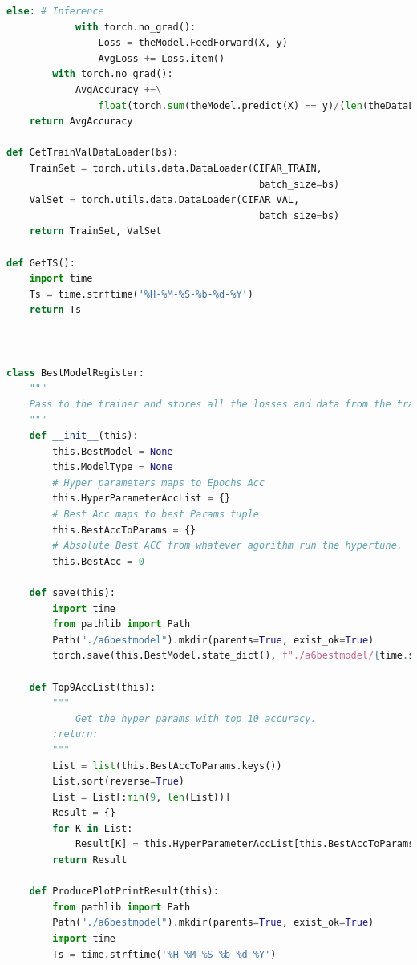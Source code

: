 \documentclass[]{article}
\begin{document}
\begin{lstlisting}[language=python]
        else: # Inference
            with torch.no_grad():
                Loss = theModel.FeedForward(X, y)
                AvgLoss += Loss.item()
        with torch.no_grad():
            AvgAccuracy +=\
                float(torch.sum(theModel.predict(X) == y)/(len(theDataLoader)*len(y)))
    return AvgAccuracy

def GetTrainValDataLoader(bs):
    TrainSet = torch.utils.data.DataLoader(CIFAR_TRAIN,
                                            batch_size=bs)
    ValSet = torch.utils.data.DataLoader(CIFAR_VAL,
                                            batch_size=bs)
    return TrainSet, ValSet

def GetTS():
    import time
    Ts = time.strftime('%H-%M-%S-%b-%d-%Y')
    return Ts



class BestModelRegister:
    """
    Pass to the trainer and stores all the losses and data from the training process.
    """
    def __init__(this):
        this.BestModel = None
        this.ModelType = None
        # Hyper parameters maps to Epochs Acc
        this.HyperParameterAccList = {}
        # Best Acc maps to best Params tuple
        this.BestAccToParams = {}
        # Absolute Best ACC from whatever agorithm run the hypertune.
        this.BestAcc = 0

    def save(this):
        import time
        from pathlib import Path
        Path("./a6bestmodel").mkdir(parents=True, exist_ok=True)
        torch.save(this.BestModel.state_dict(), f"./a6bestmodel/{time.strftime('%H-%M-%S-%b-%d-%Y')}")

    def Top9AccList(this):
        """
            Get the hyper params with top 10 accuracy.
        :return:
        """
        List = list(this.BestAccToParams.keys())
        List.sort(reverse=True)
        List = List[:min(9, len(List))]
        Result = {}
        for K in List:
            Result[K] = this.HyperParameterAccList[this.BestAccToParams[K]]
        return Result

    def ProducePlotPrintResult(this):
        from pathlib import Path
        Path("./a6bestmodel").mkdir(parents=True, exist_ok=True)
        import time
        Ts = time.strftime('%H-%M-%S-%b-%d-%Y')


\end{lstlisting}
\end{document}
